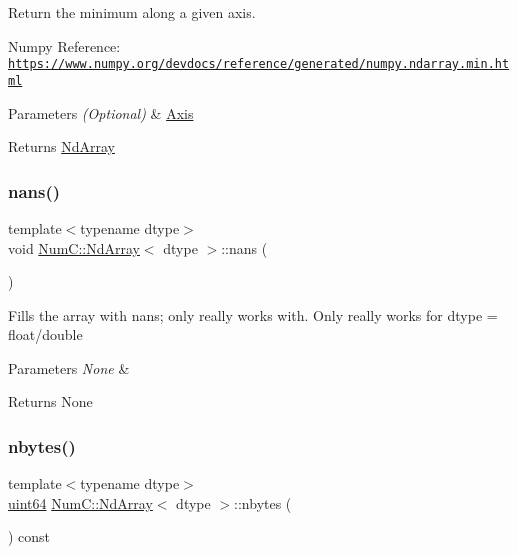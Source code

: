 Return the minimum along a given axis.

Numpy Reference\+: \href{https://www.numpy.org/devdocs/reference/generated/numpy.ndarray.min.html}{\tt https\+://www.\+numpy.\+org/devdocs/reference/generated/numpy.\+ndarray.\+min.\+html}


\begin{DoxyParams}{Parameters}
{\em (\+Optional)} & \mbox{\hyperlink{struct_num_c_1_1_axis}{Axis}} \\
\hline
\end{DoxyParams}
\begin{DoxyReturn}{Returns}
\mbox{\hyperlink{class_num_c_1_1_nd_array}{Nd\+Array}} 
\end{DoxyReturn}
\mbox{\label{class_num_c_1_1_nd_array_ad218314b7efa61051b2bbcf683d19354}} 
\subsubsection{\texorpdfstring{nans()}{nans()}}
{\footnotesize\ttfamily template$<$typename dtype$>$ \\
void \mbox{\hyperlink{class_num_c_1_1_nd_array}{Num\+C\+::\+Nd\+Array}}$<$ dtype $>$\+::nans (\begin{DoxyParamCaption}{ }\end{DoxyParamCaption})\hspace{0.3cm}{\ttfamily [inline]}}

Fills the array with nans; only really works with. Only really works for dtype = float/double


\begin{DoxyParams}{Parameters}
{\em None} & \\
\hline
\end{DoxyParams}
\begin{DoxyReturn}{Returns}
None 
\end{DoxyReturn}
\mbox{\label{class_num_c_1_1_nd_array_a68b69a2bce03b4a10961c51fff965522}} 
\subsubsection{\texorpdfstring{nbytes()}{nbytes()}}
{\footnotesize\ttfamily template$<$typename dtype$>$ \\
\mbox{\hyperlink{namespace_num_c_a22306a0884a815781c5b147415f6d817}{uint64}} \mbox{\hyperlink{class_num_c_1_1_nd_array}{Num\+C\+::\+Nd\+Array}}$<$ dtype $>$\+::nbytes (\begin{DoxyParamCaption}{ }\end{DoxyParamCaption}) const\hspace{0.3cm}{\ttfamily [inline]}}

